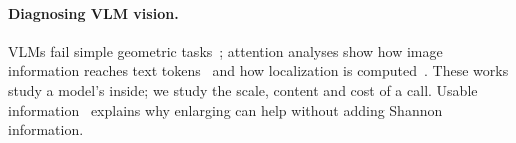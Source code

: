 \paragraph{Diagnosing VLM vision.} VLMs fail simple geometric tasks~\cite{rahmanzadehgervi2024blind}; attention analyses show how image information reaches text tokens~\cite{kaduri2025whats} and how localization is computed~\cite{schaumloeffel2026mechanisms}. These works study a model's inside; we study the scale, content and cost of a call. Usable information~\cite{xu2020usable} explains why enlarging can help without adding Shannon information.
